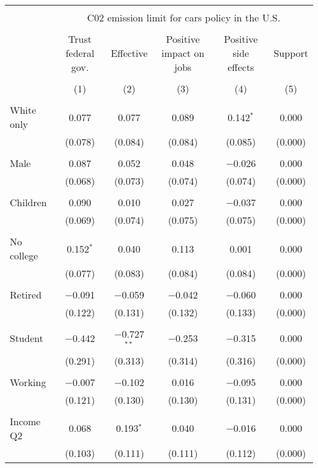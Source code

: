 
\begin{tabular}{@{\extracolsep{5pt}}lccccc} 
\\[-1.8ex]\hline 
\hline \\[-1.8ex] 
 & \multicolumn{5}{c}{C02 emission limit for cars policy in the U.S.} \\ 
\cline{2-6} 
\\[-1.8ex] & Trust federal gov. & Effective & Positive impact on jobs & Positive side effects & Support \\ 
\\[-1.8ex] & (1) & (2) & (3) & (4) & (5)\\ 
\hline \\[-1.8ex] 
 White only & 0.077 & 0.077 & 0.089 & 0.142$^{*}$ & 0.000 \\ 
  & (0.078) & (0.084) & (0.084) & (0.085) & (0.000) \\ 
  & & & & & \\ 
 Male & 0.087 & 0.052 & 0.048 & $-$0.026 & 0.000 \\ 
  & (0.068) & (0.073) & (0.074) & (0.074) & (0.000) \\ 
  & & & & & \\ 
 Children & 0.090 & 0.010 & 0.027 & $-$0.037 & 0.000 \\ 
  & (0.069) & (0.074) & (0.075) & (0.075) & (0.000) \\ 
  & & & & & \\ 
 No college & 0.152$^{*}$ & 0.040 & 0.113 & 0.001 & 0.000 \\ 
  & (0.077) & (0.083) & (0.084) & (0.084) & (0.000) \\ 
  & & & & & \\ 
 Retired & $-$0.091 & $-$0.059 & $-$0.042 & $-$0.060 & 0.000 \\ 
  & (0.122) & (0.131) & (0.132) & (0.133) & (0.000) \\ 
  & & & & & \\ 
 Student & $-$0.442 & $-$0.727$^{**}$ & $-$0.253 & $-$0.315 & 0.000 \\ 
  & (0.291) & (0.313) & (0.314) & (0.316) & (0.000) \\ 
  & & & & & \\ 
 Working & $-$0.007 & $-$0.102 & 0.016 & $-$0.095 & 0.000 \\ 
  & (0.121) & (0.130) & (0.130) & (0.131) & (0.000) \\ 
  & & & & & \\ 
 Income Q2 & 0.068 & 0.193$^{*}$ & 0.040 & $-$0.016 & 0.000 \\ 
  & (0.103) & (0.111) & (0.111) & (0.112) & (0.000) \\ 

\end{tabular}
